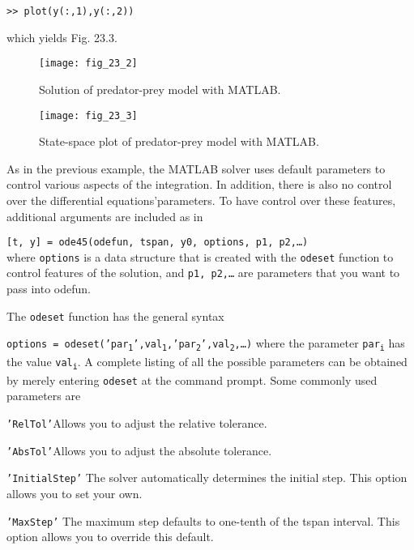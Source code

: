 \documentclass[../main.tex]{subfiles}
\begin{document}
\begin{exmp}
\texttt{>> plot(y(:,1),y(:,2))}

\noindent which yields Fig. 23.3.

\begin{figure}[H]
    \centering
    \texttt{[image: fig\_23\_2]}
   \caption{\textsf{Solution of predator-prey model with MATLAB.}}\label{fig:fig_23_2}
\end{figure}

\begin{figure}[H]
    \centering
    \texttt{[image: fig\_23\_3]}
   \caption{\textsf{State-space plot of predator-prey model with MATLAB.\
   }}\label{fig:fig_23_3}
\end{figure}
\end{exmp}

As in the previous example, the MATLAB solver uses default parameters to control various aspects of the integration. In addition, there is also no control over the differential equations'parameters. To have control over these features, additional arguments are included as in

\texttt{[t, y] = ode45(odefun, tspan, y0, options, p1, p2,\ldots)}\\
where  \texttt{options} is a data structure that is created with the \texttt{odeset} function to control features of the solution, and \texttt{p1, p2,\ldots} are parameters that you want to pass into odefun.

The \texttt{odeset} function has the general syntax

\texttt{options = odeset('par\textsubscript{1}',val\textsubscript{1},'par\textsubscript{2}',val\textsubscript{2},\ldots)}
where the parameter \texttt{par\textsubscript{i}} has the value \texttt{val\textsubscript{i}}. A complete listing of all the possible parameters can be obtained by merely entering \texttt{odeset} at the command prompt. Some commonly used parameters are

\texttt{'RelTol'}\indent Allows you to adjust the relative tolerance.

\texttt{'AbsTol'}\indent Allows you to adjust the absolute tolerance.

\texttt{'InitialStep'}\hspace{1mm} The solver automatically determines the initial step. This option allows you to set your own. 

\texttt{'MaxStep'}\hspace{9mm} The maximum step defaults to one-tenth of the tspan interval. This option allows you to override this default.
\end{document}
